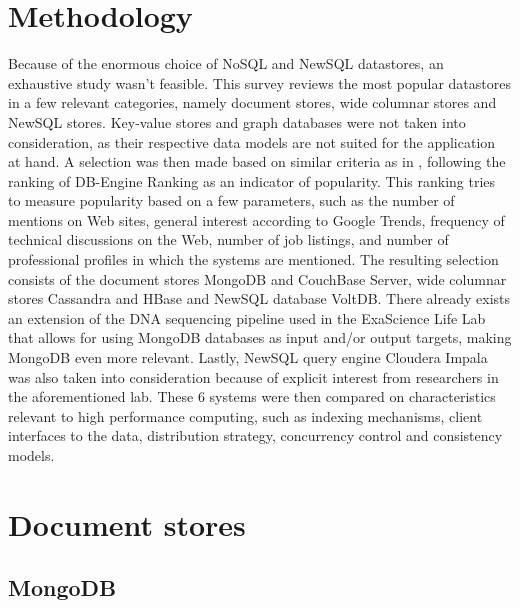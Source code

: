 \documentclass{IEEEtran}
\begin{document}
\begin{landscape}

\end{landscape}

\section{Methodology}

Because of the enormous choice of NoSQL and NewSQL datastores, an exhaustive study wasn't feasible. This survey reviews the most popular datastores in a few relevant categories, namely document stores, wide columnar stores and NewSQL stores. Key-value stores and graph databases were not taken into consideration, as their respective data models are not suited for the application at hand. A selection was then made based on similar criteria as in \cite{grolinger2013data}, following the ranking of DB-Engine Ranking \cite{db_engine_rank} as an indicator of popularity. This ranking tries to measure popularity based on a few parameters, such as the number of mentions on Web sites, general interest according to Google Trends, frequency of technical discussions on the Web, number of job listings, and number of professional profiles in which the systems are mentioned. The resulting selection consists of the document stores MongoDB and CouchBase Server, wide columnar stores Cassandra and HBase and NewSQL database VoltDB. There already exists an extension of the DNA sequencing pipeline used in the ExaScience Life Lab that allows for using MongoDB databases as input and/or output targets, making MongoDB even more relevant\cite{elprep_mongo}. Lastly, NewSQL query engine Cloudera Impala was also taken into consideration because of explicit interest from researchers in the aforementioned lab.
These 6 systems were then compared on characteristics relevant to high performance computing, such as indexing mechanisms, client interfaces to the data, distribution strategy, concurrency control and consistency models.

\section{Document stores}

\subsection{MongoDB}
\end{document}

